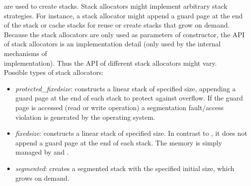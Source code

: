 are used to create stacks. Stack allocators might implement arbitrary stack
strategies. For instance, a stack allocator might append a guard page at the
end of the stack or cache stacks for reuse or create stacks that grow on
demand.\\
Because the stack allocators are only used as parameters of \ectx constructor,
the API of stack allocators is an implementation detail (only used by the
internal mechanisms of\\
\ectx implementation). Thus the API of different stack allocators might vary.\\
Possible types of stack allocators:
\begin{itemize}
    \item \emph{protected\_fixedsize}: constructs a linear stack of specified
        size, appending a guard page at the end of each stack to protect against
        overflow. If the guard page is accessed (read or write operation) a
        segmentation fault/access violation is generated by the operating system.
    \item \emph{fixedsize}: constructs a linear stack of specified size. In
        contrast to , it does not append a guard page
        at the end of each stack. The memory is simply managed by
         and .
    \item \emph{segmented}: creates a segmented stack with the specified initial
        size, which grows on demand.
\end{itemize}
